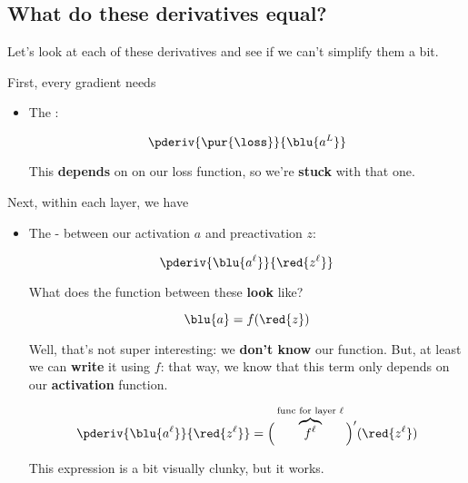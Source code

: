     
    \subsection*{What do these derivatives equal?}
    
        Let's look at each of these derivatives and see if we can't simplify them a bit.
        
        First, every gradient needs
        
        \begin{itemize}
            \item The :
            
                \begin{equation}
                    \pderiv {\pur{\loss}} {\blu{a^L}}
                \end{equation}
                
                This \textbf{depends} on on our loss function, so we're \textbf{stuck} with that one.
            
        \end{itemize}
            
        Next, within each layer, we have
        
        \begin{itemize}
            \item The  - between our activation $a$ and preactivation $z$:
            
                \begin{equation}
                    \pderiv {\blu{a^\ell}}   {\red{z^\ell}}
                \end{equation}
                
                What does the function between these \textbf{look} like?
                
                \begin{equation}
                    \blu{a} = f(\red{z})
                \end{equation}
                
                Well, that's not super interesting: we \textbf{don't know }our function. But, at least we can \textbf{write} it using $f$: that way, we know that this term only depends on our \textbf{activation} function.
                
                \begin{equation}
                    \pderiv {\blu{a^\ell}}   {\red{z^\ell}} 
                    = 
                    \Big(
                        \overbrace{
                        f^\ell 
                        }^{\text{func for layer $\ell$}}
                    \Big)'
                    (
                        \red{z^\ell}
                    )
                \end{equation}
                
                This expression is a bit visually clunky, but it works.
                
        \end{itemize}
        
